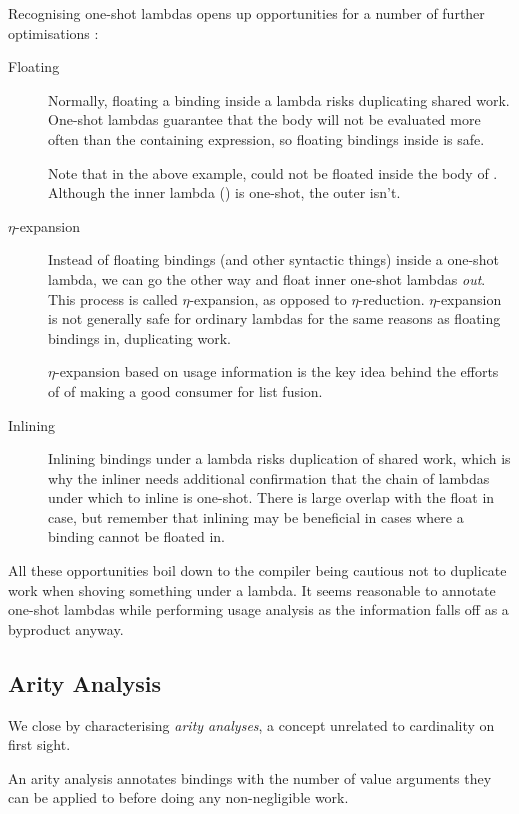 Recognising one-shot lambdas opens up opportunities for a number of further optimisations \parencite[section~6.6.2]{warnsbrough}:
\begin{description}
  \item[Floating]
    Normally, floating a  binding inside a lambda risks duplicating shared work.
    One-shot lambdas guarantee that the body will not be evaluated more often than the containing expression, so floating bindings inside is safe.

    Note that in the above example,  could not be floated inside the body of .
    Although the inner lambda () is one-shot, the outer isn't.
  \item[$\eta$-expansion]
    Instead of floating  bindings (and other syntactic things) inside a one-shot lambda, we can go the other way and float inner one-shot lambdas \emph{out}.
    This process is called $\eta$-expansion, as opposed to $\eta$-reduction.
    $\eta$-expansion is not generally safe for ordinary lambdas for the same reasons as floating  bindings in, \eg duplicating work.

    $\eta$-expansion based on usage information is the key idea behind the efforts of \textcite{callarity} of making  a good consumer for list fusion.
  \item[Inlining]
    Inlining bindings under a lambda risks duplication of shared work, which is why the inliner needs additional confirmation that the chain of lambdas under which to inline is one-shot.
    There is large overlap with the float in case, but remember that inlining may be beneficial in cases where a binding cannot be floated in.
\end{description}

All these opportunities boil down to the compiler being cautious not to duplicate work when shoving something under a lambda.
It seems reasonable to annotate one-shot lambdas while performing usage analysis as the information falls off as a byproduct anyway.

\subsection{Arity Analysis}\label{sec:arity}

We close by characterising \emph{arity analyses}, a concept unrelated to cardinality on first sight.

An arity analysis annotates bindings with the number of value arguments they can be applied to before doing any non-negligible work.

